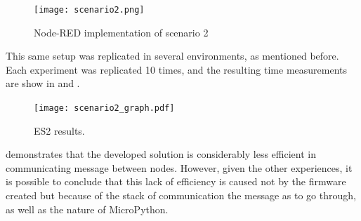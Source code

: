 \begin{figure}[h]
\centering
\texttt{[image: scenario2.png]}
\caption[Node-RED implementation of scenario 2]{Node-RED implementation of scenario 2}\label{fig:scenario2_node_red}
\end{figure}

This same setup was replicated in several environments, as mentioned before. Each experiment was replicated 10 times, and the resulting time measurements are show in  and .

\captionsetup{belowskip=12pt,aboveskip=4pt}
\begin{table}[ht]
    \centering
    \caption{Scenario 2 results}
    \label{tab:scenario2_table}
\end{table}{}

\begin{figure}[h]
\centering
\texttt{[image: scenario2\_graph.pdf]}
\caption[ES2 results.]{ES2 results.}\label{fig:scenario2_candlestick}
\end{figure}

 demonstrates that the developed solution is considerably less efficient in communicating message between nodes. However, given the other experiences, it is possible to conclude that this lack of efficiency is caused not by the firmware created but because of the stack of communication the message as to go through, as well as the nature of MicroPython. 

